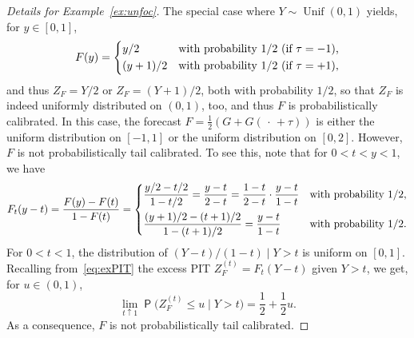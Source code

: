 \documentclass[12pt]{article}
\newcommand{\Q}{\operatorname{\mathsf{P}}}
\newcommand{\1}{\mathbf{1}} %
\newcommand{\Unif}{\operatorname{Unif}} %
\newcommand{\ZFt}{Z_{F}^{(t)}} %
\theoremstyle{definition}
\begin{document}
\begin{proof}[Details for Example~\ref{ex:unfoc}]
The special case where $Y\sim \Unif(0, 1)$ yields, for $y \in [0, 1]$, 
\[
    F(y) = 
    \begin{dcases} 
        y/2 & \text{with probability $1/2$ (if $\tau = -1$),} \\
        (y+1)/2 & \text{with probability $1/2$ (if $\tau = +1$),}
    \end{dcases}
\]
and thus $Z_{F} = Y/2$ or $Z_{F} = (Y+1)/2$, both with probability $1/2$, so that $Z_{F}$ is indeed uniformly distributed on $(0, 1)$, too, and thus $F$ is probabilistically calibrated. In this case, the forecast $F = \frac{1}{2}(G + G(\,\cdot\,+\tau))$ is either the uniform distribution on $[-1,1]$ or the uniform distribution on $[0, 2]$. However, $F$ is not probabilistically tail calibrated. To see this, note that for $0 < t < y < 1$, we have
\[
    F_t(y-t) = \frac{F(y)-F(t)}{1-F(t)}
    = \begin{dcases}
        \frac{y/2-t/2}{1-t/2} = \frac{y-t}{2-t}
        = \frac{1-t}{2-t} \cdot \frac{y-t}{1-t}
        & \text{with probability $1/2$,} \\
        \frac{(y+1)/2 - (t+1)/2}{1-(t+1)/2} =
        \frac{y-t}{1-t} & \text{with probability $1/2$.}
    \end{dcases}
\]
For $0 < t < 1$, the distribution of $(Y - t)/(1-t) \mid Y > t$ is uniform on $[0, 1]$.
Recalling from~\eqref{eq:exPIT} the excess PIT $\ZFt = F_t(Y-t)$ given $Y > t$, we get, for $u \in (0,1)$,
\[
    \lim_{t \uparrow 1} \Q\bigl(\ZFt \le u \mid Y > t\bigr)
    = \frac{1}{2} + \frac{1}{2}u.
\] 
As a consequence, $F$ is not probabilistically tail calibrated.
\end{proof}
\end{document}
